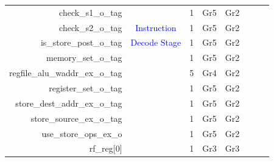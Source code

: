 \begin{table}[t]
\begin{tabular}{@{}rccccccc@{}}
        check\_s1\_o\_tag               &                                       & 1      & Gr5                         & Gr2                            &                             &                             &                             \\
        check\_s2\_o\_tag               & \textcolor{blue}{Instruction}         & 1      & Gr5                         & Gr2                            &                             &                             &                             \\
        is\_store\_post\_o\_tag         & \textcolor{blue}{Decode Stage}        & 1      & Gr5                         & Gr2                            &                             &                             &                             \\
        memory\_set\_o\_tag             &                                       & 1      & Gr5                         & Gr2                            &                             &                             &                             \\
        regfile\_alu\_waddr\_ex\_o\_tag &                                       & 5      & Gr4                         & Gr2                            &                             &                             &                             \\
        register\_set\_o\_tag           &                                       & 1      & Gr5                         & Gr2                            &                             &                             &                             \\
        store\_dest\_addr\_ex\_o\_tag   &                                       & 1      & Gr5                         & Gr2                            &                             &                             &                             \\
        store\_source\_ex\_o\_tag       &                                       & 1      & Gr5                         & Gr2                            &                             &                             &                             \\
        use\_store\_ops\_ex\_o          &                                       & 1      & Gr5                         & Gr2                            &                             &                             &                             \\\hdashline
        rf\_reg[0]                      &                                       & 1      & Gr3                         & Gr3                            &                             &                             &                             \\

\end{tabular}
\end{table}
